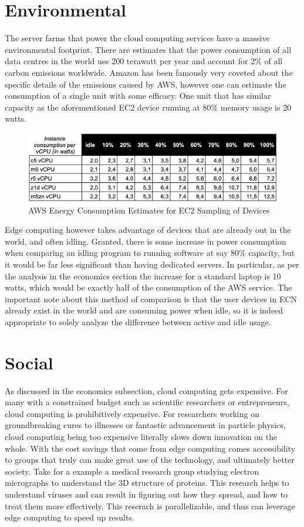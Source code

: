 \documentclass[../mthe-493-final-project.tex]{subfiles}
\begin{document}
    \section{Environmental}
    \label{sec:environmental}
    The server farms that power the cloud computing services have a massive environmental footprint. There are estimates that the power consumption of all data centres in the world use 200 terawatt per year and account for 2\% of all carbon emissions worldwide. Amazon has been famously very coveted about the specific details of the emissions caused by AWS, however one can estimate the consumption of a single unit with some efficacy. One unit that has similar capacity as the aforementioned EC2 device running at 80\% memory usage is 20 watts. 
    \begin{figure}
        \centering
        \includegraphics{thesis/img/ec2-energy-consumption.png}
        \caption{AWS Energy Consumption Estimates for EC2 Sampling of Devices}
        \label{fig:ec2-energy}
    \end{figure}
    Edge computing however takes advantage of devices that are already out in the world, and often idling. Granted, there is some increase in power consumption when comparing an idling program to running software at say 80\% capacity, but it would be far less significant than having dedicated servers. In particular, as per the analysis in the economics section the increase for a standard laptop is 10 watts, which would be exactly half of the consumption of the AWS service. The important note about this method of comparison is that the user devices in ECN already exist in the world and are consuming power when idle, so it is indeed appropriate to solely analyze the difference between active and idle usage. 

    
    \section{Social}
    \label{sec:social}
    As discussed in the economics subsection, cloud computing gets expensive. For many with a constrained budget such as scientific researchers or entrepreneurs, cloud computing is prohibitively expensive. For researchers working on groundbreaking cures to illnesses or fantastic advancement in particle physics, cloud computing being too expensive literally slows down innovation on the whole. With the cost savings that come from edge computing comes accessibility to groups that truly can make great use of the technology, and ultimately better society. Take for a example a medical research group studying electron micrographs to understand the 3D structure of proteins. This research helps to understand viruses and can result in figuring out how they spread, and how to treat them more effectively. This reserach is parallelizable, and thus can leverage edge computing to speed up results.
    
\end{document}
